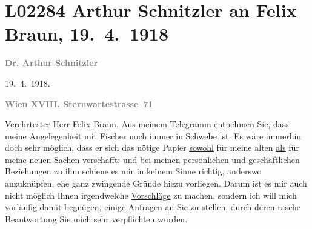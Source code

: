 

\section[Arthur Schnitzler an Felix Braun, 19. 4. 1918]{L02284 Arthur Schnitzler an Felix Braun, 19. 4. 1918}
\nopagebreak{}
\rehead{ }\normalsize\beginnumbering{}
\toendnotes[C]{\smallbreak\pagebreak[2]}
\toendnotes[C]{\smallbreak}
\toendnotes[C]{\smallbreak}
\pstart
           
\pstart
           {\pb}\textcolor{gray}{\textbf{Dr. Arthur Schnitzler}}\pend
           
\pstart
           \raggedleft{}19. 4. 1918.\pend
           \pend
           
\pstart
           \textcolor{gray}{\textbf{Wien XVIII. Sternwartestrasse 71}}\pend
           
\pstart\center{}Verehrtester Herr Felix Braun.\pend\vspace{0.5em}
\pstart
           Aus meinem Telegramm entnehmen Sie, dass meine Angelegenheit mit Fischer noch immer in Schwebe ist. Es wäre immerhin doch sehr
               möglich, dass er sich das nötige Papier \uline{sowohl} für
               meine alten \uline{als} für meine neuen Sachen verschafft;
               und bei meinen persönlichen und geschäftlichen Beziehungen zu ihm schiene es mir in
               keinem Sinne richtig, anderswo anzuknüpfen, ehe ganz zwingende Gründe hiezu
               vorliegen. Darum ist es mir auch nicht möglich Ihnen \introOben{}irgend\introOben{}welche \uline{Vorschläge} zu machen, sondern ich
               will mich vorläufig damit begnügen,  einige
               Anfragen an Sie zu stellen, durch deren rasche Beantwortung Sie mich sehr
               verpflichten würden.\pend
           

